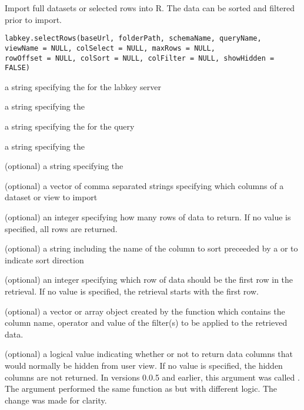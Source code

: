\begin{Description}\relax
Import full datasets or selected rows into R. The data can be sorted and filtered prior to import.
\end{Description}
\begin{Usage}
\begin{verbatim}
labkey.selectRows(baseUrl, folderPath, schemaName, queryName, 
viewName = NULL, colSelect = NULL, maxRows = NULL, 
rowOffset = NULL, colSort = NULL, colFilter = NULL, showHidden = FALSE)
\end{verbatim}
\end{Usage}
\begin{Arguments}
\begin{ldescription}
\item[\code{baseUrl}] a string specifying the for the labkey server
\item[\code{folderPath}] a string specifying the  
\item[\code{schemaName}] a string specifying the   for the query
\item[\code{queryName}] a string specifying the 
\item[\code{viewName}] (optional) a string specifying the 
\item[\code{colSelect}] (optional) a vector of comma separated strings specifying which columns of a dataset or view to import
\item[\code{maxRows}] (optional) an integer specifying how many rows of data to return. If no value is specified, all rows are returned.
\item[\code{colSort}] (optional) a string including the name of the column to sort preceeded by a \dQuote{+} or
\dQuote{-} to indicate sort direction
\item[\code{rowOffset}] (optional) an integer specifying which row of data should be the first row in the retrieval. If no
value is specified, the retrieval starts with the first row.
\item[\code{colFilter}] (optional) a vector or array object created by the  function which contains the
column name, operator and value of the filter(s) to be applied to the retrieved data.
\item[\code{showHidden}] (optional) a logical value indicating whether or not to return data columns that would normally be hidden from user view. If no value is specified, the hidden columns are not returned. In versions 0.0.5 and earlier, this argument was called . The  argument performed the same function as  but with different logic. The change was made for clarity.
\end{ldescription}
\end{Arguments}
